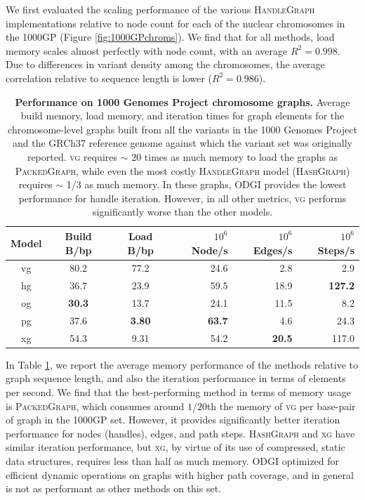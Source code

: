 \documentclass{bioinfo}
\begin{document}
We first evaluated the scaling performance of the various \textsc{HandleGraph} implementations relative to node count for each of the nuclear chromosomes in the 1000GP (Figure \ref{fig:1000GPchroms}).
We find that for all methods, load memory scales almost perfectly with node count, with an average $R^2 = 0.998$.
Due to differences in variant density among the chromosomes, the average correlation relative to sequence length is lower ($R^2 = 0.986$).

\begin{table}
  \centering
\begin{tabular}{c||c|c|r|r|r}
Model & Build B/bp & Load B/bp & $10^6$ Node/s & $10^6$ Edges/s & $10^6$ Steps/s \\
\hline
vg &   80.2 &                77.2  &              24.6 &                  2.8 &               2.9 \\
hg &   36.7 &                23.9  &              59.5 &                 18.9 &              \textbf{127.2} \\
og &   \textbf{30.3}  &   13.7  &              24.1 &                 11.5 &              8.2 \\
pg &   37.6 &                 \textbf{3.80}  &   \textbf{63.7} &   4.6 &                24.3 \\
xg &   54.3 &                9.31  &               54.2 &                 \textbf{20.5} & 117.0 \\
\hline
\end{tabular}
\caption{
  \textbf{Performance on 1000 Genomes Project chromosome graphs.}
  Average build memory, load memory, and iteration times for graph elements for the chromosome-level graphs built from all the variants in the 1000 Genomes Project and the GRCh37 reference genome against which the variant set was originally reported.
  \textsc{vg} requires $\sim$ 20 times as much memory to load the graphs as \textsc{PackedGraph}, while even the most costly \textsc{HandleGraph} model (\textsc{HashGraph}) requires $\sim$ 1/3 as much memory.
  In these graphs, \textsc{ODGI} provides the lowest performance for handle iteration.
  However, in all other metrics, \textsc{vg} performs significantly worse than the other models.
}
\label{table:1000GPchroms}
\end{table}

In Table \ref{table:1000GPchroms}, we report the average memory performance of the methods relative to graph sequence length, and also the iteration performance in terms of elements per second.
We find that the best-performing method in terms of memory usage is \textsc{PackedGraph}, which consumes around $1/20$th the memory of \textsc{vg} per base-pair of graph in the 1000GP set.
However, it provides significantly better iteration performance for nodes (handles), edges, and path steps.
\textsc{HashGraph} and \textsc{xg} have similar iteration performance, but \textsc{xg}, by virtue of its use of compressed, static data structures, requires less than half as much memory.
\textsc{ODGI} optimized for efficient dynamic operations on graphs with higher path coverage, and in general is not as performant as other methods on this set.
\end{document}
